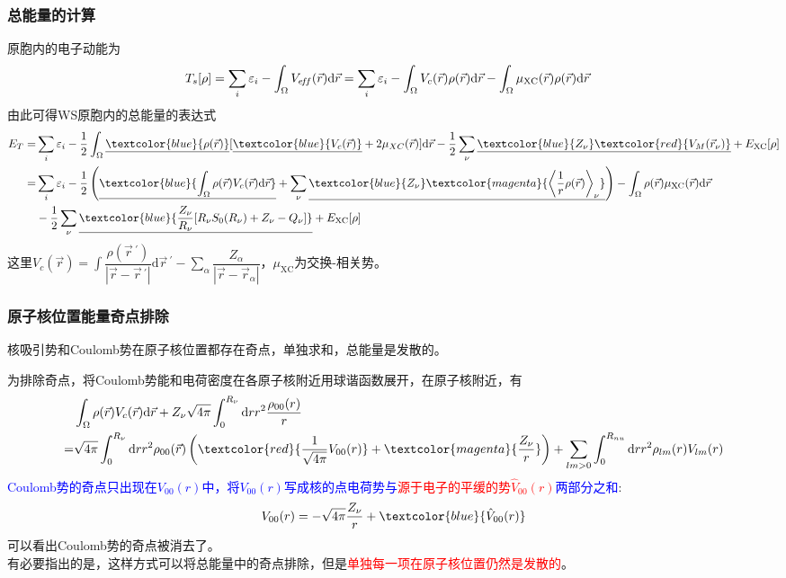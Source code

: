 \frame
{
\frametitle{总能量的计算}
原胞内的电子动能为
\begin{displaymath}
	\hspace*{-10pt}
	T_s[\rho]=\sum_i\varepsilon_i-\int_{\Omega}V_{e\!f\!f}(\vec r)\mathrm{d}\vec r=\sum_i\varepsilon_i-\int_{\Omega}V_c(\vec r)\rho(\vec r)\mathrm{d}\vec r-\int_{\Omega}\mu_{\mathrm{XC}}(\vec r)\rho(\vec r)\mathrm{d}\vec r
\end{displaymath}
由此可得\textrm{WS}原胞内的总能量的表达式
{\fontsize{9.5pt}{5.2pt}\selectfont
\begin{displaymath}
\begin{split}
	E_T=&\sum_i\varepsilon_i-\frac12\int_{\Omega}\underline{\textcolor{blue}{\rho(\vec r)}}[\underline{\textcolor{blue}{V_c(\vec r)}}+2\mu_{XC}(\vec r)]\mathrm{d}\vec r-\frac12\sum_{\nu}\underline{\textcolor{blue}{Z_{\nu}}\textcolor{red}{V_M(\vec r_{\nu})}}+E_{\mathrm{XC}}[\rho] \\
	=&\sum_i\varepsilon_i-\frac12\left(\underline{\textcolor{blue}{\int_{\Omega}\rho(\vec r)V_c(\vec r)\mathrm{d}\vec r}}+\sum_{\nu}\underline{\textcolor{blue}{Z_{\nu}}\textcolor{magenta}{\bigg\langle\frac1r\rho(\vec r)\bigg\rangle_{\nu}}}\right)-%
   \int_{\Omega}\rho(\vec r)\mu_{\mathrm{XC}}(\vec r)\mathrm{d}\vec r \\
   &-\frac12\sum_{\nu}\underline{\textcolor{blue}{\frac{Z_{\nu}}{R_{\nu}}[R_{\nu}S_0(R_{\nu})+Z_{\nu}-Q_{\nu}]}}+E_{\mathrm{XC}}[\rho]
\end{split}
\end{displaymath}
}
这里$V_c(\vec r)\!=\!\displaystyle\int\dfrac{\rho(\vec r\,^\prime)}{|\vec r-{\vec r}\,^\prime|}\mathrm{d}\vec r\,^\prime-\sum\limits_{\alpha}\dfrac{Z_{\alpha}}{|\vec r-\vec r_{\alpha}|}$，$\mu_{\mathrm{XC}}$为交换-相关势。
}

\frame
{
\frametitle{原子核位置能量奇点排除}
核吸引势和\textrm{Coulomb}势在原子核位置都存在奇点，单独求和，总能量是发散的。

为排除奇点，将\textrm{Coulomb}势能和电荷密度在各原子核附近用球谐函数展开，在原子核附近，有
{\fontsize{9.0pt}{5.2pt}\selectfont
\begin{displaymath}
  \begin{split}
    &\int_{\Omega}\rho(\vec r)V_c(\vec r)\mathrm{d}\vec r+Z_{\nu}\sqrt{4\pi}\int_0^{R_{\nu}}\mathrm{d}rr^2\frac{\rho_{00}(r)}r\\
    =&\sqrt{4\pi}\int_0^{R_{\nu}}\mathrm{d}rr^2\rho_{00}(\vec r)\left(\textcolor{red}{\dfrac1{\sqrt{4\pi}}V_{00}(r)}+\textcolor{magenta}{\frac{Z_{\nu}}r}\right)+\sum_{lm>0}\int_0^{R_{nu}}\mathrm{d}rr^2\rho_{lm}(r)V_{lm}(r)
  \end{split}
\end{displaymath}
}
\textcolor{blue}{\textrm{Coulomb}势的奇点只出现在$V_{00}(r)$中，将$V_{00}(r)$写成核的点电荷势与\textcolor{red}{源于电子的平缓的势$\hat V_{00}(r)$}两部分之和}:~
\textcolor{red}{$$V_{00}(r)=-\sqrt{4\pi}\frac{Z_{\nu}}r+\textcolor{blue}{\hat V_{00}(r)}$$}
可以看出\textrm{Coulomb}势的奇点被消去了。\\有必要指出的是，这样方式可以将总能量中的奇点排除，但是\textcolor{red}{单独每一项在原子核位置仍然是发散的}。
}

